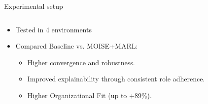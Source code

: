 \documentclass[9pt, aspectratio=169]{beamer}
\begin{document}
\begin{frame}{Experimental setup}

  \vspace{-0cm}

  \begin{columns}[c]

    \hspace{-1cm}

    \begin{column}{0.5\textwidth}
      \begin{itemize}
        \item Tested in 4 environments
        \item Compared Baseline vs. MOISE+MARL:
              \begin{itemize}
                \item Higher convergence and robustness.
                \item Improved explainability through consistent role adherence.
                \item Higher Organizational Fit (up to +89\%).
              \end{itemize}
      \end{itemize}
    \end{column}

    \hspace{-1cm}


\end{columns}
\end{frame}
\end{document}
